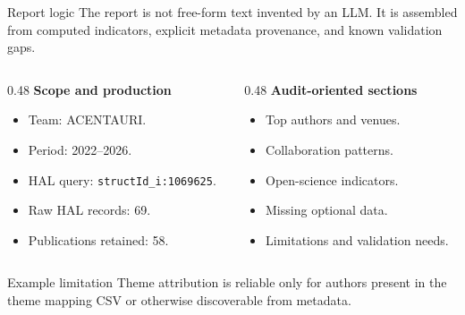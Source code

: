 \begin{frame}[t]

  \small

  \begin{block}{Report logic}
    The report is not free-form text invented by an LLM. It is assembled from computed indicators, explicit metadata provenance, and known validation gaps.
  \end{block}

  \begin{columns}[T,onlytextwidth]
    \begin{column}{0.48\textwidth}
      \textbf{Scope and production}
      \begin{itemize}
        \item Team: ACENTAURI.
        \item Period: 2022--2026.
        \item HAL query: \texttt{structId\_i:1069625}.
        \item Raw HAL records: 69.
        \item Publications retained: 58.
      \end{itemize}
    \end{column}

    \begin{column}{0.48\textwidth}
      \textbf{Audit-oriented sections}
      \begin{itemize}
        \item Top authors and venues.
        \item Collaboration patterns.
        \item Open-science indicators.
        \item Missing optional data.
        \item Limitations and validation needs.
      \end{itemize}
    \end{column}
  \end{columns}

  \begin{block}{Example limitation}
    Theme attribution is reliable only for authors present in the theme mapping CSV or otherwise discoverable from metadata.
  \end{block}
\end{frame}

